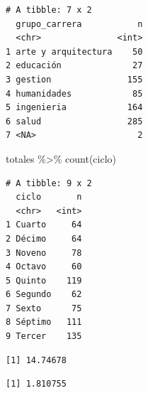 \documentclass[
  letterpaper,
  DIV=11,
  numbers=noendperiod]{scrartcl}
\newenvironment{Shaded}{\begin{snugshade}}{\end{snugshade}}
\newcommand{\AttributeTok}[1]{\textcolor[rgb]{0.40,0.45,0.13}{#1}}
\newcommand{\FunctionTok}[1]{\textcolor[rgb]{0.28,0.35,0.67}{#1}}
\newcommand{\NormalTok}[1]{\textcolor[rgb]{0.00,0.23,0.31}{#1}}
\newcommand{\SpecialCharTok}[1]{\textcolor[rgb]{0.37,0.37,0.37}{#1}}
\begin{document}
\begin{verbatim}
# A tibble: 7 x 2
  grupo_carrera           n
  <chr>               <int>
1 arte y arquitectura    50
2 educación              27
3 gestion               155
4 humanidades            85
5 ingenieria            164
6 salud                 285
7 <NA>                    2
\end{verbatim}

\begin{Shaded}
\begin{Highlighting}[]
\NormalTok{totales }\SpecialCharTok{\%\textgreater{}\%} \FunctionTok{count}\NormalTok{(ciclo)}
\end{Highlighting}
\end{Shaded}

\begin{verbatim}
# A tibble: 9 x 2
  ciclo       n
  <chr>   <int>
1 Cuarto     64
2 Décimo     64
3 Noveno     78
4 Octavo     60
5 Quinto    119
6 Segundo    62
7 Sexto      75
8 Séptimo   111
9 Tercer    135
\end{verbatim}

\begin{Shaded}
\end{Shaded}

\begin{verbatim}
[1] 14.74678
\end{verbatim}

\begin{Shaded}
\end{Shaded}

\begin{verbatim}
[1] 1.810755
\end{verbatim}

\begin{Shaded}
\end{Shaded}
\end{document}

